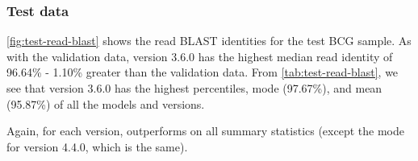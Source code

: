 \begin{table}
\centering
{}
\caption{Relative read length for the \mtb{}-specific basecalling model \tubby{} compared with the default \guppy{} model on the validation data. Relative read length is the length of the aligned part of the read, divided by the total length of the read. Version indicates the \guppy{} version used for the basecalling prior to, and after, training. Count refers to the number of reads evaluated. std=standard deviation.}
\label{tab:read-rel-len}
\end{table}

\subsubsection{Test data}

\autoref{fig:test-read-blast} shows the read BLAST identities for the test BCG sample. As with the validation data, version 3.6.0 \tubby{} has the highest median read identity of 96.64\% - 1.10\% greater than the validation data. From \autoref{tab:test-read-blast}, we see that \tubby{} version 3.6.0 has the highest percentiles, mode (97.67\%), and mean (95.87\%) of all the models and versions.

Again, for each version, \tubby{} outperforms \guppy{} on all summary statistics (except the mode for version 4.4.0, which is the same).


